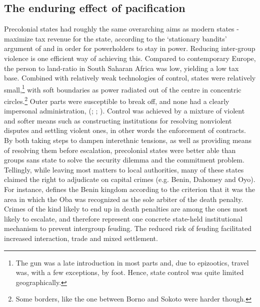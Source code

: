 \subsection{The enduring effect of pacification} 
\label{The enduring effect of pacification}

Precolonial states had roughly the same overarching aims as modern states -
maximize tax revenue for the state, according to the `stationary bandits'
argument of \citet{tilly_1985} and \citet{Olson1993} in order for powerholders
to stay in power. Reducing inter-group violence is one efficient way of
achieving this. Compared to contemporary Europe, the person to land-ratio in
South Saharan Africa was low, yielding a low tax base. Combined with relatively
weak technologies of control, states were relatively small,\footnote{The gun was
a late introduction in most parts and, due to epizootics, travel was, with a few
exceptions, by foot. Hence, state control was quite limited geographically.}
with soft boundaries as power radiated out of the centre in concentric
circles.\footnote{Some borders, like the one between Borno and Sokoto were
harder though.} Outer parts were susceptible to break off, and none had a
clearly impersonal administration, (\citealp[20]{englebert2013inside};
\citealp{Herbst2014}; \citealp[135]{tibebu1995making}). Control was achieved by
a mixture of violent and softer means such as constructing institutions for
resolving nonviolent disputes and settling violent ones, in other words the
enforcement of contracts. By both taking steps to dampen interethnic tensions,
as well as providing means of resolving them before escalation, precolonial
states were better able than groups sans state to solve the security dilemma and
the commitment problem. Tellingly, while leaving most matters to local
authorities, many of these states claimed the right to adjudicate on capital
crimes (e.g. Benin, Dahomey and Oyo). For instance,
\citet[3-4]{BradburyR.E1970TBka} defines the Benin kingdom according to the
criterion that it was the area in which the Oba was recognized as the sole
arbiter of the death penalty. Crimes of the kind likely to end up in death
penalties are among the ones most likely to escalate, and therefore represent
one concrete state-held institutional mechanism to prevent intergroup feuding.
The reduced risk of feuding facilitated increased interaction, trade and mixed
settlement.

